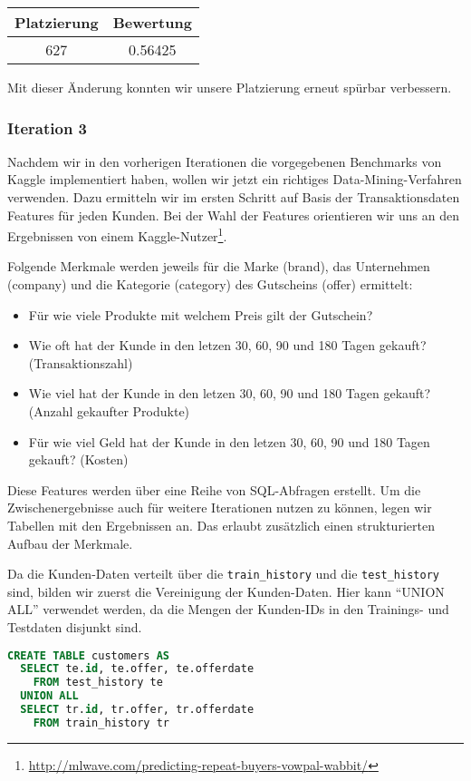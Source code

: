 \begin{tabular}{|c|c|}
	\hline \textbf{Platzierung} & \textbf{Bewertung} \\ 
	\hline 627 & 0.56425  \\ 
	\hline 
\end{tabular}

Mit dieser Änderung konnten wir unsere Platzierung erneut spürbar verbessern.

\subsubsection{Iteration 3}

Nachdem wir in den vorherigen Iterationen die vorgegebenen Benchmarks von Kaggle implementiert haben,
wollen wir jetzt ein richtiges Data-Mining-Verfahren verwenden. Dazu ermitteln wir im ersten Schritt
auf Basis der Transaktionsdaten Features für jeden Kunden. Bei der Wahl der Features orientieren
wir uns an den Ergebnissen von einem 
Kaggle-Nutzer\footnote{\url{http://mlwave.com/predicting-repeat-buyers-vowpal-wabbit/}}.

Folgende Merkmale werden jeweils für die Marke (brand), das Unternehmen (company) und die Kategorie (category)
des Gutscheins (offer) ermittelt:
\begin{itemize}
	\item Für wie viele Produkte mit welchem Preis gilt der Gutschein?
	\item Wie oft hat der Kunde in den letzen 30, 60, 90 und 180 Tagen gekauft? (Transaktionszahl)
	\item Wie viel hat der Kunde in den letzen 30, 60, 90 und 180 Tagen gekauft? (Anzahl gekaufter Produkte)
	\item Für wie viel Geld hat der Kunde in den letzen 30, 60, 90 und 180 Tagen gekauft? (Kosten)
\end{itemize}

Diese Features werden über eine Reihe von SQL-Abfragen erstellt. Um die Zwischenergebnisse auch für
weitere Iterationen nutzen zu können, legen wir Tabellen mit den Ergebnissen an. Das erlaubt zusätzlich
einen strukturierten Aufbau der Merkmale.

Da die Kunden-Daten verteilt über die \texttt{train\_history} und die \texttt{test\_history} sind, 
bilden wir zuerst die Vereinigung der Kunden-Daten. Hier kann "`UNION ALL"' verwendet werden, da die 
Mengen der Kunden-IDs in den Trainings- und Testdaten disjunkt sind.

\begin{lstlisting}[language=SQL]
CREATE TABLE customers AS 
  SELECT te.id, te.offer, te.offerdate
    FROM test_history te
  UNION ALL
  SELECT tr.id, tr.offer, tr.offerdate
    FROM train_history tr 
\end{lstlisting}

